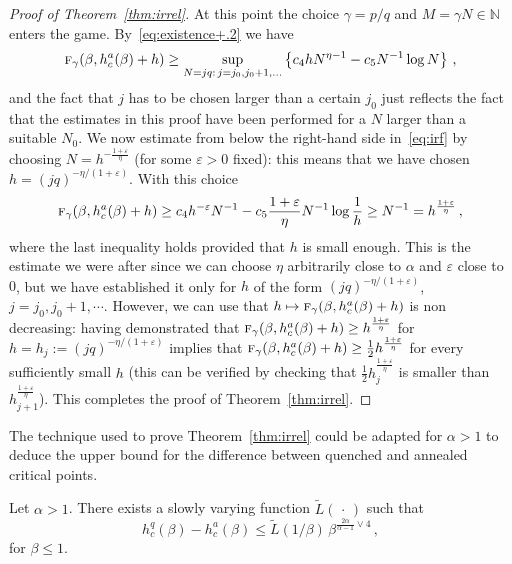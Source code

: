 \documentclass[10pt]{amsart}
\theoremstyle{definition}\newtheorem{defi}[theo]{Definition}\newtheorem{rema}[theo]{Remark}\newtheorem{exam}[theo]{Example}\newtheorem{exem}[theo]{Example}\newtheorem{nota}[theo]{Notation}
\newcommand{\ga}{\alpha}
\newcommand{\gb}{\beta}
\newcommand{\gep}{\varepsilon}
\newcommand{\tf}{\textsc{f}} %
\renewcommand{\tilde}{\widetilde}
\newcommand{\bbN}{\ensuremath{\mathbb{N}}}
\begin{document}
\begin{proof}[Proof of Theorem~\ref{thm:irrel}]
At this point the choice $\gamma=p/q$ and $M=\gamma N \in \bbN$ enters the game. By~\eqref{eq:existence+.2} we have
\begin{equation}\label{eq:irf}
\tf_{\gamma}(\gb,h_c^a(\gb) +h) \geq \sup_{N=jq :\,j =j_0, j_0+1, \ldots} \left\{ c_4 h N^{\eta-1} - c_5 N^{-1} \log N \right\}\,,
\end{equation}
and the fact that $j$ has to be chosen larger than a certain $j_0$ just reflects the fact that the estimates in this proof have been performed for a $N$ larger than a suitable $N_0$. We now estimate from below the right-hand side in~\eqref{eq:irf} by choosing $N= h^{-\frac{1+\gep}{\eta}}$ (for some $\gep>0$ fixed): this means that we have chosen $h=(jq)^{-\eta/(1+\gep)}$. With this choice
\begin{equation}
\tf_{\gamma}(\gb,h_c^a(\gb) +h) \geq c_4 h^{-\gep} N^{-1} - c_5 \frac{1+\gep}{\eta} N^{-1} \log \frac 1h \geq N^{-1} = h^{\frac{1+\gep}{\eta}}\,,
\end{equation}
where the last inequality holds provided that $h$ is small enough. This is the estimate we were after since we can choose $\eta$ arbitrarily close to $\ga$ and $\gep$ close to $0$, but we have established it only for $h$ of the form $(jq)^{-\eta/(1+\gep)}$, $j=j_0, j_0+1, \cdots$. However, we can use that $h\mapsto \tf_{\gamma}(\gb,h_c^a(\gb) +h)$ is non decreasing: having demonstrated that $\tf_{\gamma}(\gb,h_c^a(\gb) +h)\ge h^{\frac{1+\gep}{\eta}}$ for $h=h_j:=(jq)^{-\eta/(1+\gep)}$ implies that $\tf_{\gamma}(\gb,h_c^a(\gb) +h)\ge \tfrac12 h^{\frac{1+\gep}{\eta}}$ for every sufficiently small $h$ (this can be verified by checking that $\tfrac12 h_j^{\frac{1+\gep}{\eta}}$ is smaller than $h_{j+1}^{\frac{1+\gep}{\eta}}$). This completes the proof of Theorem~\ref{thm:irrel}.
\end{proof}





The technique used to prove Theorem~\ref{thm:irrel} could be adapted for $\ga >1$ to deduce the upper bound for the difference between quenched and annealed critical points.

\begin{prop}
Let $\ga >1$. There exists a slowly varying function $\tilde{L}({\,\cdot\,})$ such that
\begin{equation}
h_c^q(\beta) - h_c^a (\beta) \le
\tilde{L}(1/\gb)\,\gb^{\frac{2\ga}{\ga-1} \vee 4}\,,
\end{equation}
for $\beta \le 1$.
\end{prop}
\end{document}
